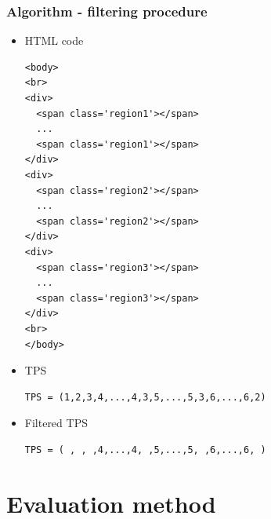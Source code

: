 \documentclass{beamer}
\begin{document}
\begin{frame}[fragile]
\frametitle{Algorithm - filtering procedure}
\fontsize{8}{7.2}\selectfont
\begin{itemize}
\item{HTML code} 
\begin{verbatim}
<body>
<br>
<div>
  <span class='region1'></span>
  ...
  <span class='region1'></span>
</div> 
<div>
  <span class='region2'></span>
  ...
  <span class='region2'></span>
</div>
<div>
  <span class='region3'></span>
  ...
  <span class='region3'></span>
</div>
<br>
</body>
\end{verbatim}
\item{TPS}
\begin{verbatim}
TPS = (1,2,3,4,...,4,3,5,...,5,3,6,...,6,2)
\end{verbatim}
\item{Filtered TPS}
\begin{verbatim}
TPS = ( , , ,4,...,4, ,5,...,5, ,6,...,6, )
\end{verbatim}
\end{itemize}
\end{frame}

\section{Evaluation method} 
\end{document}
